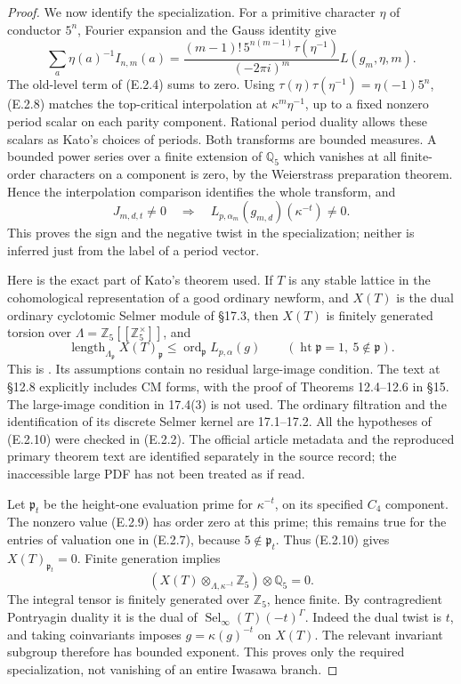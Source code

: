 \begin{proof}
We now identify the specialization. For a primitive
character \(\eta\) of conductor \(5^n\), Fourier expansion
and the Gauss identity give
\[
 \sum_a\eta(a)^{-1}I_{n,m}(a)
 =\frac{(m-1)!\,5^{n(m-1)}\tau(\eta^{-1})}
 {(-2\pi i)^m}L(g_m,\eta,m).                           \tag{E.2.8}
\]
The old-level term of (E.2.4) sums to zero. Using
\(\tau(\eta)\tau(\eta^{-1})=\eta(-1)5^n\),
(E.2.8) matches the top-critical interpolation
\cite[Theorem 16.2, with \(r=m\)]{DE_Kato2004} at
\(\kappa^m\eta^{-1}\), up to a fixed nonzero period
scalar on each parity component. Rational period duality
allows these scalars as Kato's choices of periods.
Both transforms are bounded measures. A bounded power
series over a finite extension of \(\mathbb Q_5\) which
vanishes at all finite-order characters on a component
is zero, by the Weierstrass preparation theorem. Hence
the interpolation comparison identifies the whole
transform, and
\[
 J_{m,d,t}\ne0
 \quad\Longrightarrow\quad
 L_{p,\alpha_m}(g_{m,d})(\kappa^{-t})\ne0.              \tag{E.2.9}
\]
This proves the sign and the negative twist in the
specialization; neither is inferred just from the label
of a period vector.

Here is the exact part of Kato's theorem used. If \(T\)
is any stable lattice in the cohomological representation
of a good ordinary newform, and \(X(T)\) is the dual
ordinary cyclotomic Selmer module of \S17.3, then
\(X(T)\) is finitely generated torsion over
\(\Lambda=\mathbb Z_5[[\mathbb Z_5^\times]]\), and
\[
 \operatorname{length}_{\Lambda_{\mathfrak p}}X(T)_{\mathfrak p}
 \le \operatorname{ord}_{\mathfrak p}L_{p,\alpha}(g)
 \qquad(\operatorname{ht}\mathfrak p=1,\ 5\notin\mathfrak p).
                                                               \tag{E.2.10}
\]
This is \cite[Theorem 17.4(1)--(2)]{DE_Kato2004}.
Its assumptions contain no residual large-image condition.
The text at \S12.8 explicitly includes CM forms, with
the proof of Theorems 12.4--12.6 in \S15. The large-image
condition in 17.4(3) is not used. The ordinary filtration
and the identification of its discrete Selmer kernel are
17.1--17.2. All the hypotheses of (E.2.10) were checked
in (E.2.2). The official article metadata and the
reproduced primary theorem text are identified separately
in the source record; the inaccessible large PDF has not
been treated as if read.

Let \(\mathfrak p_t\) be the height-one evaluation prime
for \(\kappa^{-t}\), on its specified \(C_4\) component.
The nonzero value (E.2.9) has order zero at this prime;
this remains true for the entries of valuation one in
(E.2.7), because \(5\notin\mathfrak p_t\).
Thus (E.2.10) gives \(X(T)_{\mathfrak p_t}=0\).
Finite generation implies
\[
 \left(X(T)\otimes_{\Lambda,\kappa^{-t}}\mathbb Z_5\right)
 \otimes\mathbb Q_5=0.
\]
The integral tensor is finitely generated over
\(\mathbb Z_5\), hence finite. By contragredient
Pontryagin duality it is the dual of
\(\operatorname{Sel}_\infty(T)(-t)^{\Gamma}\).
Indeed the dual twist is \(t\), and taking coinvariants
imposes \(g=\kappa(g)^{-t}\) on \(X(T)\).
The relevant invariant subgroup therefore has bounded
exponent. This proves only the required specialization,
not vanishing of an entire Iwasawa branch.


\end{proof}
